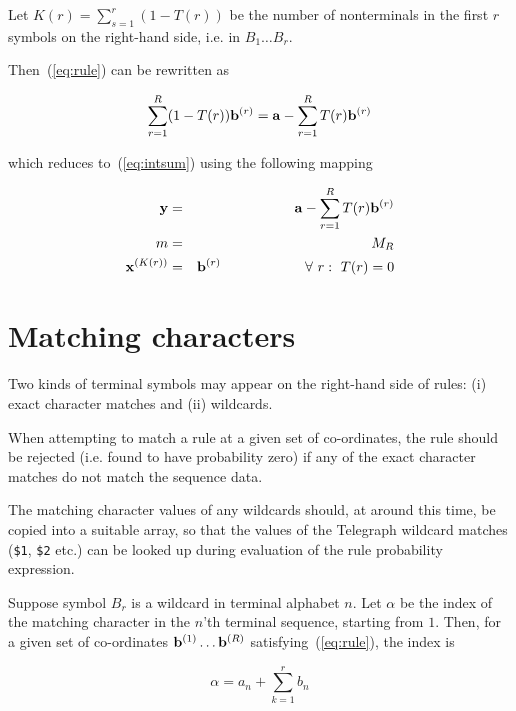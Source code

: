 \documentclass{article}
\begin{document}
Let $K(r)= \sum_{s=1}^r (1-T(r))$ be the number of nonterminals
in the first $r$ symbols on the right-hand side, i.e. in $B_1 \ldots B_r$.

Then~(\ref{eq:rule}) can be rewritten as

\[
\sum_{r=1}^R (1-T(r)) {\bf b}^{(r)} = {\bf a} - \sum_{r=1}^R T(r) {\bf b}^{(r)}
\]

which reduces to~(\ref{eq:intsum}) using the following mapping

\begin{eqnarray*}
         {\bf y} & = & {\bf a} - \sum_{r=1}^R T(r) {\bf b}^{(r)} \\
               m & = & M_R \\
{\bf x}^{(K(r))} & = & {\bf b}^{(r)}
 \quad \quad \quad \quad \quad \quad \forall\ r:\ T(r)=0
\end{eqnarray*}


\section{Matching characters}

Two kinds of terminal symbols may appear on the right-hand side of rules:
(i) exact character matches and (ii) wildcards.

When attempting to match a rule at a given set of co-ordinates,
the rule should be rejected (i.e. found to have probability zero)
if any of the exact character matches do not match the sequence data.

The matching character values of any wildcards should, at around this time,
be copied into a suitable array, so that the values of the Telegraph
wildcard matches ({\tt \$1}, {\tt \$2} etc.) can be looked up
during evaluation of the rule probability expression.

Suppose symbol $B_r$ is a wildcard in terminal alphabet $n$.
Let $\alpha$ be the index of the matching character in the $n$'th
terminal sequence, starting from $1$.
Then, for a given set of co-ordinates ${\bf b}^{(1)} \ldots {\bf b}^{(R)}$
satisfying~(\ref{eq:rule}), the index is

\[
\alpha = a_n + \sum_{k=1}^r b_n
\]


\newpage
\end{document}
